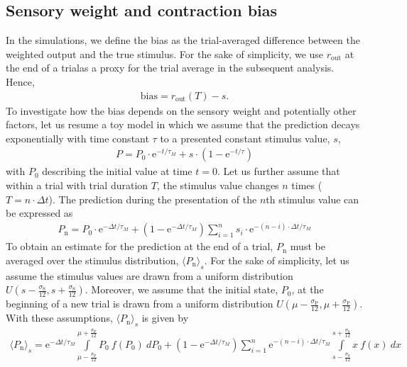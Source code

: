 \documentclass[10pt,a4paper]{article}
\providecommand{\DIFaddtex}[1]{{\protect\color{blue}\uwave{#1}}} %
\providecommand{\DIFaddbegin}{} %
\providecommand{\DIFaddend}{} %
\providecommand{\DIFadd}[1]{\texorpdfstring{\DIFaddtex{#1}}{#1}} %
\newcommand{\DIFaddincludegraphics}[2][]{{\color{blue}\fbox{\DIFOincludegraphics[#1]{#2}}}} %
\DeclareRobustCommand{\DIFaddbegin}{\DIFOaddbegin \let\includegraphics\DIFaddincludegraphics} %
\DeclareRobustCommand{\DIFaddend}{\DIFOaddend \let\includegraphics\DIFOincludegraphics} %
\begin{document}
\subsection{Sensory weight and contraction bias}
%
In the simulations, we define the bias as the trial-averaged difference between the weighted output and the true stimulus. For the sake of simplicity, we use $r_\mathrm{out}$ at the end of a trial\DIFaddbegin \DIFadd{, $T$, }\DIFaddend as a proxy for the trial average in the subsequent analysis. Hence, 
%
\begin{align}
 \mathrm{bias} = r_\mathrm{out}(T) - s.
\end{align}
%
To investigate how the bias depends on the sensory weight and potentially other factors, let us resume a toy model in which we assume that the prediction decays exponentially with time constant $\tau$ to a presented constant stimulus value, $s$,
%
\begin{align}
P = P_\mathrm{0} \cdot \mathrm{e}^{-t/\tau_M} +  s \cdot \left( 1 -   \mathrm{e}^{-t/\tau} \right)
\end{align}
%
with $P_0$ describing the initial value at time $t=0$. Let us further assume that within a trial with trial duration $T$, the stimulus value changes $n$ times ($T = n\cdot \Delta t$).  The prediction during the presentation of the $n$th stimulus value can be expressed as
%
\begin{align}
P_\mathrm{n} = P_\mathrm{0} \cdot \mathrm{e}^{-\Delta t/\tau_M}  + \left( 1 -   \mathrm{e}^{-\Delta t/\tau_M} \right) \sum_{i=1}^{n} s_i \cdot \mathrm{e}^{-(n-i)\cdot \Delta t/ \tau_M}
\end{align}
%
To obtain an estimate for the prediction at the end of a trial, $P_\mathrm{n}$ must be averaged over the stimulus distribution, $\langle P_\mathrm{n} \rangle_s$. For the sake of simplicity, let us assume the stimulus values are drawn from a uniform distribution $U\left( s - \frac{\sigma_\mathrm{S}}{12}, s + \frac{\sigma_\mathrm{S}}{12} \right)$. Moreover, we assume that the initial state, $P_0$, at the beginning of a new trial is drawn from a uniform distribution $U\left( \mu - \frac{\sigma_\mathrm{P}}{12}, \mu + \frac{\sigma_\mathrm{P}}{12} \right)$. With these assumptions, $\langle P_\mathrm{n} \rangle_s$ is given by
%
\begin{align}
\langle P_\mathrm{n} \rangle_s = \mathrm{e}^{-\Delta t/\tau_M}  \int\limits_{\mu - \frac{\sigma_\mathrm{P}}{12}}^{\mu + \frac{\sigma_\mathrm{P}}{12}} P_\mathrm{0} \ f(P_\mathrm{0})\ dP_0+ \left( 1 -   \mathrm{e}^{-\Delta t/\tau_M} \right) \sum_{i=1}^{n} \mathrm{e}^{-(n-i)\cdot \Delta t/ \tau_M} \int\limits_{s - \frac{\sigma_\mathrm{S}}{12}}^{s + \frac{\sigma_\mathrm{S}}{12}} x\ f(x)\ dx
\end{align}
\end{document}
